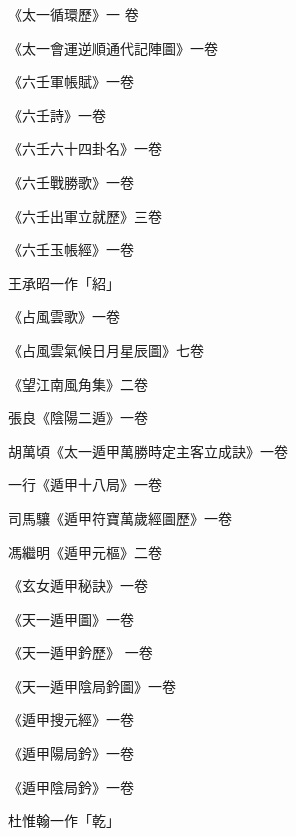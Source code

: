 \begin{pinyinscope}
 《太一循環歷》一
 卷



 《太一會運逆順通代記陣圖》一卷



 《六壬軍帳賦》一卷



 《六壬詩》一卷



 《六壬六十四卦名》一卷



 《六壬戰勝歌》一卷



 《六壬出軍立就歷》三卷



 《六壬玉帳經》一卷



 王承昭一作「紹」



 《占風雲歌》一卷



 《占風雲氣候日月星辰圖》七卷



 《望江南風角集》二卷



 張良《陰陽二遁》一卷



 胡萬頃《太一遁甲萬勝時定主客立成訣》一卷



 一行《遁甲十八局》一卷



 司馬驤《遁甲符寶萬歲經圖歷》一卷



 馮繼明《遁甲元樞》二卷



 《玄女遁甲秘訣》一卷



 《天一遁甲圖》一卷



 《天一遁甲鈐歷》
 一卷



 《天一遁甲陰局鈐圖》一卷



 《遁甲搜元經》一卷



 《遁甲陽局鈐》一卷



 《遁甲陰局鈐》一卷



 杜惟翰一作「乾」




\end{pinyinscope}
